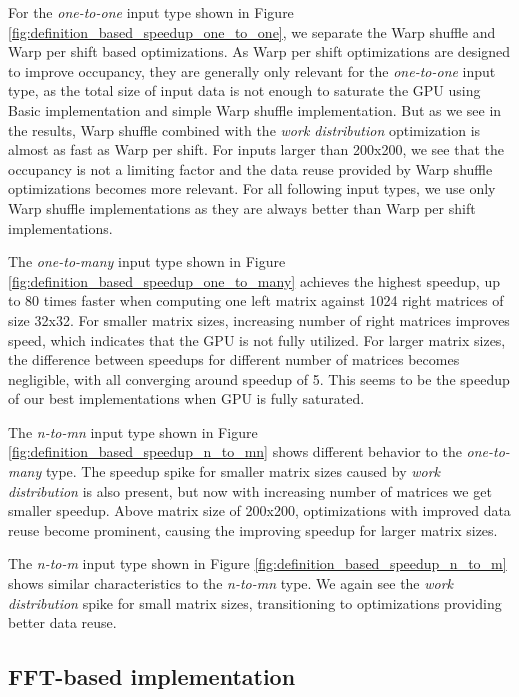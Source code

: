 For the \textit{one-to-one} input type shown in Figure \ref{fig:definition_based_speedup_one_to_one}, we separate the Warp shuffle and Warp per shift based optimizations. As Warp per shift optimizations are designed to improve occupancy, they are generally only relevant for the \textit{one-to-one} input type, as the total size of input data is not enough  to saturate the GPU using Basic implementation and simple Warp shuffle implementation. But as we see in the results, Warp shuffle combined with the \textit{work distribution} optimization is almost as fast as Warp per shift. For inputs larger than 200x200, we see that the occupancy is not a limiting factor and the data reuse provided by Warp shuffle optimizations becomes more relevant. For all following input types, we use only Warp shuffle implementations as they are always better than Warp per shift implementations.

The \textit{one-to-many} input type shown in Figure \ref{fig:definition_based_speedup_one_to_many} achieves the highest speedup, up to 80 times faster when computing one left matrix against 1024 right matrices of size 32x32. For smaller matrix sizes, increasing number of right matrices improves speed, which indicates that the GPU is not fully utilized. For larger matrix sizes, the difference between speedups for different number of matrices becomes negligible, with all converging around speedup of 5. This seems to be the speedup of our best implementations when GPU is fully saturated.

The \textit{n-to-mn} input type shown in Figure \ref{fig:definition_based_speedup_n_to_mn} shows different behavior to the \textit{one-to-many} type. The speedup spike for smaller matrix sizes caused by \textit{work distribution} is also present, but now with increasing number of matrices we get smaller speedup. Above matrix size of 200x200, optimizations with improved data reuse become prominent, causing the improving speedup for larger matrix sizes.

The \textit{n-to-m} input type shown in Figure \ref{fig:definition_based_speedup_n_to_m} shows similar characteristics to the \textit{n-to-mn} type. We again see the \textit{work distribution} spike for small matrix sizes, transitioning to optimizations providing better data reuse.

\subsection{FFT-based implementation}

